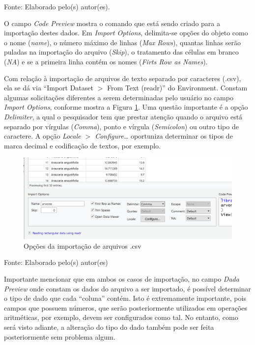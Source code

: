 \documentclass[12pt,brazil,oneside]{book}
\begin{document}
Fonte: Elaborado pelo(s) autor(es).

O campo \emph{Code Preview} mostra o comando que está sendo criado para a importação destes dados. Em \emph{Import Options}, delimita-se opções do objeto como o nome (\emph{name}), o número máximo de linhas (\emph{Max Rows}), quantas linhas serão puladas na importação do arquivo (\emph{Skip}), o tratamento das células em branco (\emph{NA}) e se a primeira linha contém os nomes (\emph{Firts Row as Names}).

Com relação à importação de arquivos de texto separado por caracteres (.csv), ela se dá via ``Import Dataset \(>\) From Text (readr)'' do Environment. Constam algumas solicitações diferentes a serem determinadas pelo usuário no campo \emph{Import Options}, conforme mostra a Figura \ref{fig:r4csv}. Uma questão importante é a opção \emph{Delimiter}, a qual o pesquisador tem que prestar atenção quando o arquivo está separado por vírgulas (\emph{Comma}), ponto e vírgula (\emph{Semicolon}) ou outro tipo de caractere. A opção \emph{Locale \(>\) Configure\ldots{}} oportuniza determinar os tipos de marca decimal e codificação de textos, por exemplo.

\begin{figure}[H]

{\centering \includegraphics[width=0.7\linewidth]{r4csv} 

}

\caption{Opções da importação de arquivos .csv}\label{fig:r4csv}
\end{figure}

Fonte: Elaborado pelo(s) autor(es)

Importante mencionar que em ambos os casos de importação, no campo \emph{Dada Preview} onde constam os dados do arquivo a ser importado, é possível determinar o tipo de dado que cada ``coluna'' contém. Isto é extremamente importante, pois campos que possuem números, que serão posteriormente utilizados em operações aritméticas, por exemplo, devem ser configurados como tal. No entanto, como será visto adiante, a alteração do tipo do dado também pode ser feita posteriormente sem problema algum.
\end{document}
